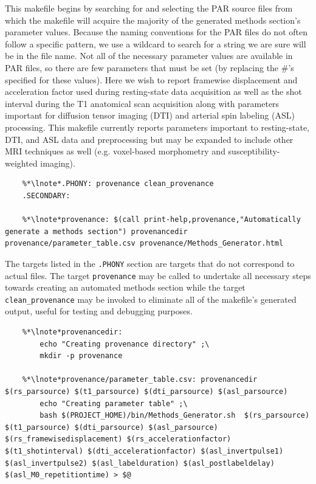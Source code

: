 This makefile begins by  searching for and selecting the PAR source files from which the makefile will acquire the majority of the generated methods section's parameter values. Because the naming conventions for the PAR files do not often follow a specific pattern, we use a wildcard to search for a string we are sure will be in the file name.  Not all of the necessary parameter values are available in PAR files, so there are few parameters that must be set (by replacing the #'s specified for these values). Here we wish to report framewise displacement and acceleration factor used during resting-state data acquisition as well as the shot interval during the T1 anatomical scan acquisition along with parameters important for diffusion tensor imaging (DTI) and arterial spin labeling (ASL) processing. This makefile currently reports parameters important to resting-state, DTI, and ASL data and preprocessing but may be expanded to include other MRI techniques as well (e.g. voxel-based morphometry and susceptibility-weighted imaging).

\newpage

\begin{lstlisting}
	%*\lnote*.PHONY: provenance clean_provenance
	.SECONDARY:
	
	%*\lnote*provenance: $(call print-help,provenance,"Automatically generate a methods section") provenancedir provenance/parameter_table.csv provenance/Methods_Generator.html
\end{lstlisting}

 The targets listed in the \texttt{.PHONY} section are targets that do not correspond to actual files. The target  \texttt{provenance} may be called to undertake all necessary steps towards creating an automated methods section while the target \texttt{clean_provenance} may be invoked to eliminate all of the makefile's generated output, useful for testing and debugging purposes.

\begin{lstlisting}
	%*\lnote*provenancedir: 
		echo "Creating provenance directory" ;\
		mkdir -p provenance
		
	%*\lnote*provenance/parameter_table.csv: provenancedir $(rs_parsource) $(t1_parsource) $(dti_parsource) $(asl_parsource)
		echo "Creating parameter table" ;\
		bash $(PROJECT_HOME)/bin/Methods_Generator.sh  $(rs_parsource) $(t1_parsource) $(dti_parsource) $(asl_parsource) $(rs_framewisedisplacement) $(rs_accelerationfactor) $(t1_shotinterval) $(dti_accelerationfactor) $(asl_invertpulse1) $(asl_invertpulse2) $(asl_labelduration) $(asl_postlabeldelay) $(asl_M0_repetitiontime) > $@
\end{lstlisting}


